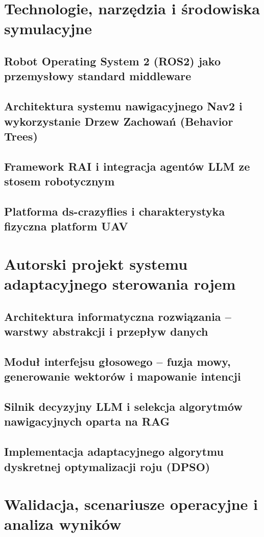 \documentclass[12pt,a4paper,twoside]{report}
\theoremstyle{definition} %
\begin{document}
\cleardoublepage
\chapter{Technologie, narzędzia i środowiska symulacyjne}
\section{Robot Operating System 2 (ROS2) jako przemysłowy standard middleware}
\section{Architektura systemu nawigacyjnego Nav2 i wykorzystanie Drzew Zachowań (Behavior Trees)}
\section{Framework RAI i integracja agentów LLM ze stosem robotycznym}
\section{Platforma ds-crazyflies i charakterystyka fizyczna platform UAV}

\cleardoublepage
\chapter{Autorski projekt systemu adaptacyjnego sterowania rojem}
\section{Architektura informatyczna rozwiązania – warstwy abstrakcji i przepływ danych}
\section{Moduł interfejsu głosowego – fuzja mowy, generowanie wektorów i mapowanie intencji}
\section{Silnik decyzyjny LLM i selekcja algorytmów nawigacyjnych oparta na RAG}
\section{Implementacja adaptacyjnego algorytmu dyskretnej optymalizacji roju (DPSO)}

\cleardoublepage
\chapter{Walidacja, scenariusze operacyjne i analiza wyników}
\end{document}
